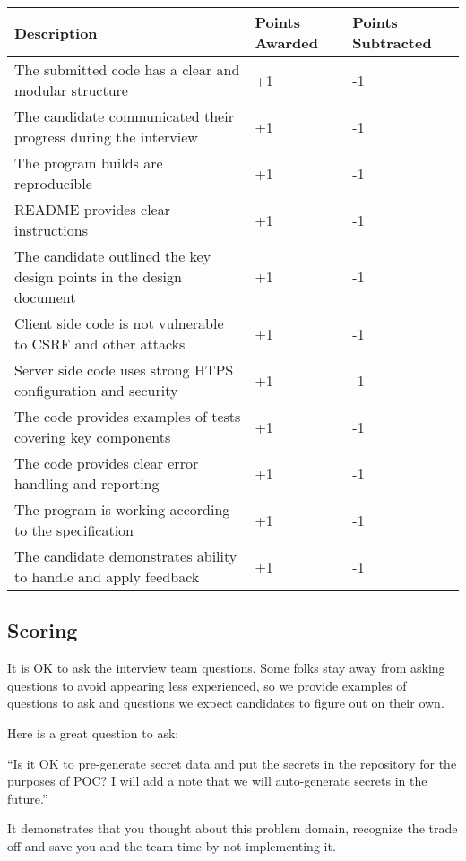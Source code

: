 \documentclass{article}
\begin{document}
\begin{center}
\begin{tabular}{ | m{25em} | m{5em}| m{5em} | }
  \hline
  \rowcolor{blue!60!black!10}
  Description & Points Awarded & Points Subtracted \\
  \hline
  The submitted code has a clear and modular structure & +1 & -1 \\
  \hline
  The candidate communicated their progress during the interview & +1 & -1 \\
  \hline
  The program builds are reproducible & +1 & -1 \\
  \hline
  README provides clear instructions & +1 & -1 \\
  \hline
  The candidate outlined the key design points in the design document & +1 & -1 \\
  \hline
  Client side code is not vulnerable to CSRF and other attacks & +1 & -1 \\
  \hline
  Server side code uses strong HTPS configuration and security & +1 & -1 \\
  \hline
  The code provides examples of tests covering key components & +1 & -1 \\
  \hline
  The code provides clear error handling and reporting & +1 & -1 \\
  \hline
  The program is working according to the specification & +1 & -1 \\
  \hline
  The candidate demonstrates ability to handle and apply feedback & +1 & -1 \\
  \hline
\end{tabular}
\end{center}

\subsection{Scoring}

It is OK to ask the interview team questions. Some folks stay away from
asking questions to avoid appearing less experienced, so we provide examples of questions
to ask and questions we expect candidates to figure out on their own.

Here is a great question to ask:

``Is it OK to pre-generate secret data and put the secrets in the repository for the purposes of POC? I will add a note that we will auto-generate secrets in the future.''

It demonstrates that you thought about this problem domain, recognize the trade off and save you and the team time by not implementing it.
\end{document}
